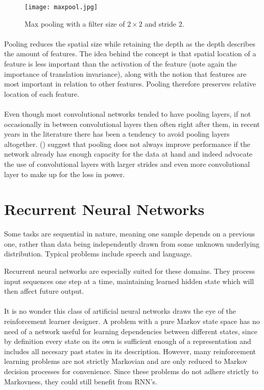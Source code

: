 \begin{figure}[htpb]
  \centering
  \texttt{[image: maxpool.jpg]}
  \caption{Max pooling with a filter size of $2 \times 2$
    and stride $2$.
  }
  \label{fig:maxpool}
\end{figure}

\paragraph{}
Pooling reduces the spatial size
while retaining the depth
as the depth describes the amount of features.
The idea behind the concept
is that spatial location of a feature is less important
than the activation of the feature
(note again the importance of translation invariance),
along with the notion that features are most important
in relation to other features.
Pooling therefore preserves relative location of each feature.

\paragraph{}
Even though most convolutional networks
tended to have pooling layers,
if not occasionally in between convolutional layers
then often right after them,
in recent years in the literature
there has been a tendency to avoid pooling layers altogether.
\citeauthor{Springenberg2015}
(\citeyear{Springenberg2015})
suggest that pooling does not always improve performance
if the network already has enough capacity for the data at hand
and indeed advocate the use of convolutional layers
with larger strides
and even more convolutional layer
to make up for the loss in power.

\section{Recurrent Neural Networks}
\label{sec:rnn}
Some tasks are sequential in nature,
meaning one sample depends on a previous one,
rather than data being independently
drawn from some unknown underlying distribution.
Typical problems include speech and language.

Recurrent neural networks are especially suited
for these domains.
They process input sequences one step at a time,
maintaining learned hidden state which will then
affect future output.

\paragraph{}
It is no wonder this class of artificial neural networks
draws the eye of the reinforcement learner designer.
A problem with a pure Markov state space
has no need of a network useful for learning dependencies between different states,
since by definition every state on its own is sufficient enough of a representation
and includes all necesary past states in its description.
However, many reinforcement learning problems are not strictly Markovian
and are only reduced to Markov decision processes for convenience.
Since these problems do not adhere strictly to Markovness,
they could still benefit from RNN's.

